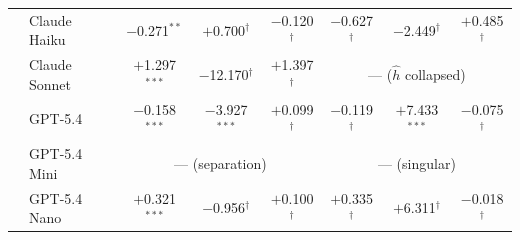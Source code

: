 \begin{table}[t]
\begin{tabular}{ll ccc ccc}
\addlinespace
\multirow{5}{*}{GPQA-Diam.}
  & Claude Haiku  & $-$0.271$^{**}$  & $+$0.700$^\dagger$    & $-$0.120$^\dagger$  & $-$0.627$^\dagger$ & $-$2.449$^\dagger$ & $+$0.485$^\dagger$ \\
  & Claude Sonnet & $+$1.297$^{***}$ & $-$12.170$^\dagger$   & $+$1.397$^\dagger$  & \multicolumn{3}{c}{--- \tiny{($\hat h$ collapsed)}} \\
  & GPT-5.4       & $-$0.158$^{***}$ & $-$3.927$^{***}$      & $+$0.099$^\dagger$  & $-$0.119$^\dagger$ & $+$7.433$^{***}$ & $-$0.075$^\dagger$ \\
  & GPT-5.4 Mini  & \multicolumn{3}{c}{--- \tiny{(separation)}}                                & \multicolumn{3}{c}{--- (singular)} \\
  & GPT-5.4 Nano  & $+$0.321$^{***}$ & $-$0.956$^\dagger$    & $+$0.100$^\dagger$  & $+$0.335$^\dagger$ & $+$6.311$^\dagger$ & $-$0.018$^\dagger$ \\
\bottomrule
\end{tabular}
\end{table}
